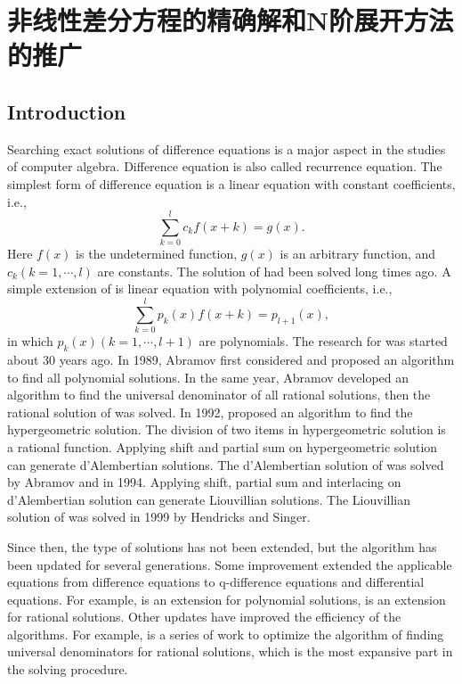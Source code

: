 \chapter{非线性差分方程的精确解和N阶展开方法的推广}
\section{Introduction}\label{Introduction-02}

Searching exact solutions of difference equations is a major aspect in the studies of computer algebra. Difference equation is also called recurrence equation. The simplest form of difference equation is a linear equation with constant coefficients, i.e.,
\begin{equation}
\sum_{k=0}^l{c_k f(x+k)}=g(x).
\label{ceq}
\end{equation}
Here $f(x)$ is the undetermined function, $g(x)$ is an arbitrary function, and $c_k (k=1,\cdots,l)$ are constants. The solution of  had been solved long times ago.  A simple extension of   is linear equation with polynomial coefficients, i.e.,
\begin{equation}
\sum_{k=0}^l{p_k(x)f(x+k)=p_{l+1}(x)},
\label{peq}
\end{equation}
in which $p_k(x) (k=1,\cdots,l+1)$ are polynomials. The research for  was started about 30 years ago. In 1989, Abramov first considered  and proposed an algorithm to find all polynomial solutions\citep{Abramov1989polynomial}. In the same year, Abramov developed an algorithm to find the universal denominator of all rational solutions, then the rational solution of  was solved\citep{Abramov1989rational}. In 1992, \Petkovsek{} proposed an algorithm to find the hypergeometric solution\citep{petkovvsek1992hypergeometric}. The division of two items in hypergeometric solution is a rational function. Applying shift and partial sum on hypergeometric solution can generate d'Alembertian solutions. The d'Alembertian solution of  was solved by Abramov and \Petkovsek{} in 1994\citep{abramov1994dAlembertian}. Applying shift, partial sum and interlacing on d'Alembertian solution can generate Liouvillian solutions. The Liouvillian solution of  was solved in 1999 by Hendricks and Singer\citep{hendricks1999Liouvillian}.

Since then, the type of solutions has not been extended, but the algorithm has been updated for several generations. Some improvement extended the applicable equations from difference equations to q-difference equations and differential equations. For example, \cite{Abramov1995polynomial} is an extension for polynomial solutions, \cite{Abramov1995Rational} is an extension for rational solutions. Other updates have improved the efficiency of the algorithms. For example, \cite{ud2007,ud2010,ud2011,ud2012} is a series of work to optimize the algorithm of finding universal denominators for rational solutions, which is the most expansive part in the solving procedure.

